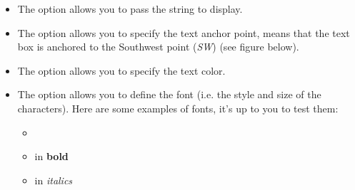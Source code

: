 \documentclass[11pt,class=report,crop=false]{standalone}
\begin{document}
\begin{cours}
\begin{itemize}
  \item The  option allows you to pass the string to display.
  
  \item The  option allows you to specify the text anchor point,  means that the text box is anchored to the Southwest point (\emph{SW}) (see figure below).
  
  \item The  option allows you to specify the text color.
  
  \item The option  allows you to define the font (i.e. the style and size of the characters). Here are some examples of fonts, it's up to you to test them:
  \begin{itemize}
    \item {} 
    \item {} in \textbf{bold}
    \item {} in \emph{italics}
  \end{itemize}  
\end{itemize}



\end{cours}


\end{document}

